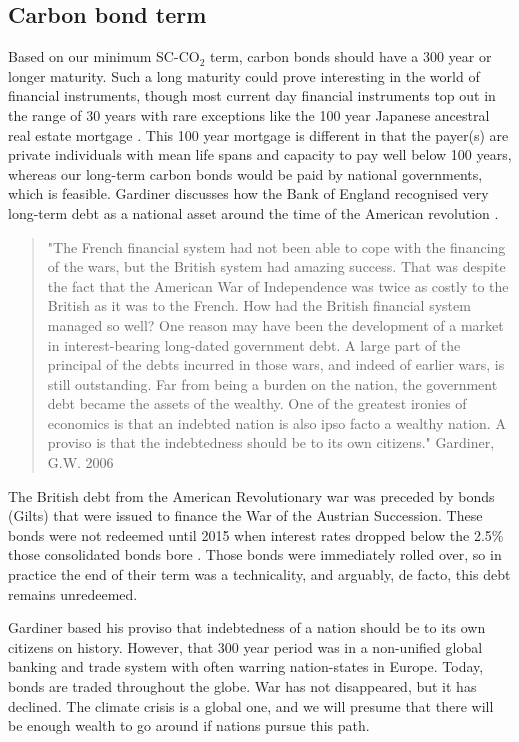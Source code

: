 \documentclass{article}
\begin{document}
\subsection{Carbon bond term}
Based on our minimum SC-CO$_2$ term, carbon bonds should have a 300 year or longer maturity. Such a long maturity could prove interesting in the world of financial instruments, though most current day financial instruments top out in the range of 30 years with rare exceptions like the 100 year Japanese ancestral real estate mortgage \cite{CHANG1995_100yrJapanMortgage}. This 100 year mortgage is different in that the payer(s) are private individuals with mean life spans and capacity to pay well below 100 years, whereas our long-term carbon bonds would be paid by national governments, which is feasible. Gardiner discusses how the Bank of England recognised very long-term debt as a national asset around the time of the American revolution \cite{Gardiner2006EvoCreidtaryControls}. 
 
\begin{quote}
    "The French financial system had not been able to cope with the financing of the wars, but the British system had amazing success. That was despite the fact that the American War of Independence was twice as costly to the British as it was to the French. How had the British financial system managed so well? One reason may have been the development of a market in interest-bearing long-dated government debt. A large part of the principal of the debts incurred in those wars, and indeed of earlier wars, is still outstanding. Far from being a burden on the nation, the government debt became the assets of the wealthy. One of the greatest ironies of economics is that an indebted nation is also ipso facto a wealthy nation. A proviso is that the indebtedness should be to its own citizens."  Gardiner, G.W. 2006  \cite[p. 18]{Gardiner2006EvoCreidtaryControls} 
\end{quote}

The British debt from the American Revolutionary war was preceded by bonds (Gilts) that were issued to finance the War of the Austrian Succession. These bonds were not redeemed until 2015 when interest rates dropped below the 2.5\% those consolidated bonds bore \cite{Gardiner2023AustrianSuccessionGilts1740_2015}. Those bonds were immediately rolled over, so in practice the end of their term was a technicality, and arguably, de facto, this debt remains unredeemed. 

Gardiner based his proviso that indebtedness of a nation should be to its own citizens on history. However, that 300 year period was in a non-unified global banking and trade system with often warring nation-states in Europe. Today, bonds are traded throughout the globe. War has not disappeared, but it has declined. The climate crisis is a global one, and we will presume that there will be enough wealth to go around if nations pursue this path. 
\end{document}
